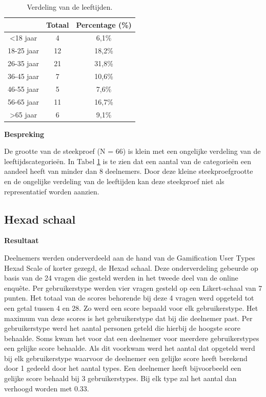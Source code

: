 \begin{table}
    \begin{center}
        \begin{tabular}{c|c|c}
            & \textbf{Totaal} & \textbf{Percentage} (\%) \\
            \hline
            <18 jaar & 4 & 6,1\% \\
            \hline
            18-25 jaar & 12 & 18,2\% \\
            \hline
            26-35 jaar & 21 & 31,8\% \\
            \hline
            36-45 jaar & 7 & 10,6\% \\
            \hline
            46-55 jaar & 5 & 7,6\% \\
            \hline
            56-65 jaar & 11 & 16,7\% \\
            \hline
            >65 jaar & 6 & 9,1\% \\
        \end{tabular}
    \end{center}
\caption{Verdeling van de leeftijden.}
\label{tab:verdelingleeftijden}
\end{table}

\textbf{Bespreking}

De grootte van de steekproef (N = 66) is klein met een ongelijke verdeling van de leeftijdscategorieën. In Tabel \ref{tab:verdelingleeftijden} is te zien dat een aantal van de categorieën een aandeel heeft van minder dan 8 deelnemers. Door deze kleine steekproefgrootte en de ongelijke verdeling van de leeftijden kan deze steekproef niet als representatief worden aanzien.

\subsection{Hexad schaal}

\textbf{Resultaat}

Deelnemers werden onderverdeeld aan de hand van de Gamification User Types Hexad Scale of korter gezegd, de Hexad schaal. Deze onderverdeling gebeurde op basis van de 24 vragen die gesteld werden in het tweede deel van de online enquête. Per gebruikerstype werden vier vragen gesteld op een Likert-schaal van 7 punten. Het totaal van de scores behorende bij deze 4 vragen werd opgeteld tot een getal tussen 4 en 28. Zo werd een score bepaald voor elk gebruikerstype. Het maximum van deze scores is het gebruikerstype dat bij die deelnemer past. Per gebruikerstype werd het aantal personen geteld die hierbij de hoogste score behaalde. Soms kwam het voor dat een deelnemer voor meerdere gebruikerstypes een gelijke score behaalde. Als dit voorkwam werd het aantal dat opgeteld werd bij elk gebruikerstype waarvoor de deelnemer een gelijke score heeft berekend door 1 gedeeld door het aantal types. Een deelnemer heeft bijvoorbeeld een gelijke score behaald bij 3 gebruikerstypes. Bij elk type zal het aantal dan verhoogd worden met 0.33.

